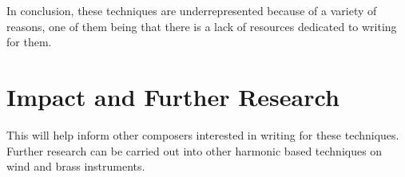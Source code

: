 In conclusion, these techniques are underrepresented because of a variety of reasons, one of them being that there is a lack of resources dedicated to writing for them.
\lipsum[2]
\section{Impact and Further Research}
This will help inform other composers interested in writing for these techniques. Further research can be carried out into other harmonic based techniques on wind and brass instruments.
\lipsum[2]
